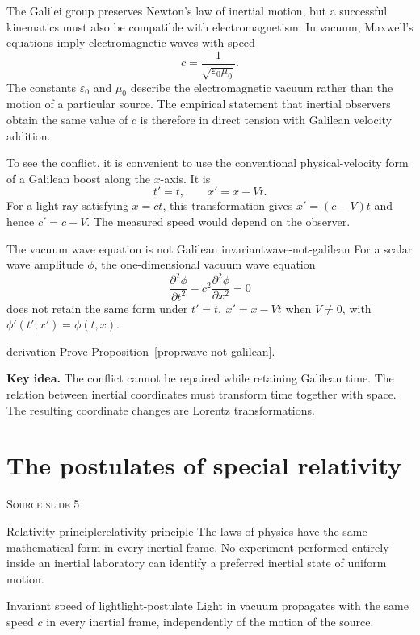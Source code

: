 \documentclass[11pt,a4paper]{article}
\newcommand{\slideref}[1]{%
  \par\smallskip
  {\footnotesize\color{ink!60}\textsc{Source slide #1}}\par
}
\newcommand{\keyidea}[1]{%
  \par\smallskip
  \begin{minipage}{\linewidth}
  \noindent\textbf{\color{vuBurgundy}Key idea.} #1
  \end{minipage}
  \par\smallskip
}
\begin{document}
The Galilei group preserves Newton's law of inertial motion, but a successful
kinematics must also be compatible with electromagnetism. In vacuum, Maxwell's
equations imply electromagnetic waves with speed
\[
  c=\frac{1}{\sqrt{\varepsilon_0\mu_0}}.
\]
The constants \(\varepsilon_0\) and \(\mu_0\) describe the electromagnetic
vacuum rather than the motion of a particular source. The empirical statement
that inertial observers obtain the same value of \(c\) is therefore in direct
tension with Galilean velocity addition.

To see the conflict, it is convenient to use the conventional physical-velocity
form of a Galilean boost along the \(x\)-axis. It is
\[
  t'=t,\qquad x'=x-Vt.
\]
For a light ray satisfying \(x=ct\), this transformation gives
\(x'=(c-V)t\) and hence \(c'=c-V\). The measured speed would depend on the
observer.

\begin{proposition}{The vacuum wave equation is not Galilean invariant}{wave-not-galilean}
For a scalar wave amplitude \(\phi\), the one-dimensional vacuum wave equation
\[
  \frac{\partial^2\phi}{\partial t^2}
  -c^2\frac{\partial^2\phi}{\partial x^2}=0
\]
does not retain the same form under \(t'=t,\ x'=x-Vt\) when \(V\ne0\), with
\(\phi'(t',x')=\phi(t,x)\).
\end{proposition}

\begin{studentwork}[height=6.0cm]{derivation}
Prove Proposition~\ref{prop:wave-not-galilean}.
\end{studentwork}

\keyidea{The conflict cannot be repaired while retaining Galilean time. The
relation between inertial coordinates must transform time together with space.
The resulting coordinate changes are Lorentz transformations.}

\section{The postulates of special relativity}
\slideref{5}

\begin{postulate}{Relativity principle}{relativity-principle}
The laws of physics have the same mathematical form in every inertial frame.
No experiment performed entirely inside an inertial laboratory can identify a
preferred inertial state of uniform motion.
\end{postulate}

\begin{postulate}{Invariant speed of light}{light-postulate}
Light in vacuum propagates with the same speed \(c\) in every inertial frame,
independently of the motion of the source.
\end{postulate}
\end{document}
